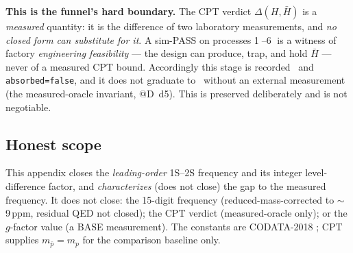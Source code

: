 \smallskip\noindent\textbf{This is the funnel's hard boundary.} The CPT
verdict $\Delta(H,\bar H)$ is a \emph{measured} quantity: it is the
difference of two laboratory measurements, and \emph{no closed form can
substitute for it}. A sim-PASS on processes
\textcircled{\scriptsize 1}--\textcircled{\scriptsize 6} is a witness of
factory \emph{engineering feasibility} --- the design can produce, trap, and
hold $\bar H$ --- never of a measured CPT bound. Accordingly this stage is
recorded \tierOrange\ and \texttt{absorbed=false}, and it does not graduate to
\tierGreen\ without an external measurement (the measured-oracle invariant,
@D~d5). This is preserved deliberately and is not negotiable.

\subsection{Honest scope}
\label{app:meas-scope}

This appendix closes the \emph{leading-order} 1S--2S frequency and its
integer level-difference factor, and \emph{characterizes} (does not close)
the gap to the measured frequency. It does not close: the 15-digit frequency
(reduced-mass-corrected to $\sim$9\,ppm, residual QED not closed); the CPT
verdict (measured-oracle only); or the $g$-factor value (a BASE measurement).
The constants are CODATA-2018 \citep{mohr2018codata}; CPT supplies
$m_{\bar p}=m_p$ for the comparison baseline only.
